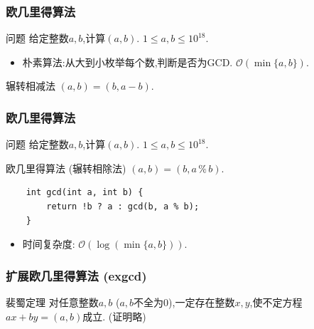 \documentclass{beamer}
\newcommand{\pau}{}
\begin{document}
\begin{frame}[fragile]
    \frametitle{欧几里得算法}
    \begin{block}{问题}
        给定整数$a,b$,计算$(a,b)$. $1\leqslant a,b\leqslant10^{18}$.
    \end{block}\pau
    \begin{itemize}
        \item 朴素算法:从大到小枚举每个数,判断是否为GCD. $\mathcal{O}(\min\{a,b\})$. 
    \end{itemize}\pau
    \begin{block}{辗转相减法}
        $(a,b)=(b,a-b)$.
    \end{block}
\end{frame}

\begin{frame}[fragile]
    \frametitle{欧几里得算法}
    \begin{block}{问题}
        给定整数$a,b$,计算$(a,b)$. $1\leqslant a,b\leqslant10^{18}$.
    \end{block}
    \begin{block}{欧几里得算法 (辗转相除法)}
        $(a,b)=(b,a\,\%\,b)$.
    \end{block}\pau
    \begin{verbatim}
    int gcd(int a, int b) {
        return !b ? a : gcd(b, a % b);
    }
    \end{verbatim}
    \pau\begin{itemize}
        \item 时间复杂度: $\mathcal{O}(\log(\min\{a,b\}))$.
    \end{itemize}
\end{frame}

\begin{frame}[fragile]
    \frametitle{扩展欧几里得算法 (exgcd)}
    \begin{block}{裴蜀定理}
        对任意整数$a,b$ ($a,b$不全为$0$),一定存在整数$x,y$,使不定方程$ax+by=(a,b)$成立. (证明略)
    \end{block}
\end{frame}
\end{document}
